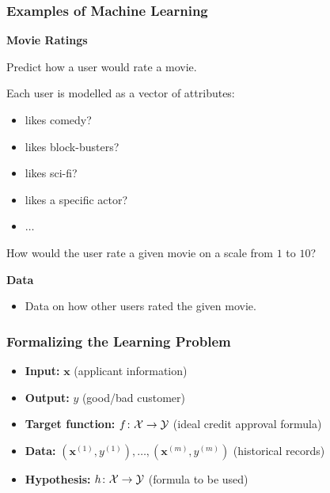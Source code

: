 \documentclass[xcolor=table]{beamer}
\newcommand{\vect}[1]{\ensuremath{\mathbf{#1}}}
\newcommand{\calX}{\ensuremath{{\cal X}}}
\newcommand{\calY}{\ensuremath{{\cal Y}}}
\begin{document}
\begin{frame}[t]
\frametitle{Examples of Machine Learning}
\textcolor{orange2}{\textbf{Movie Ratings}}

Predict how a user would rate a movie.

\pause

\medskip

Each user is modelled as a vector of attributes:
\begin{itemize}
    \item likes comedy?  
    \item likes block-busters?
    \item likes sci-fi?
    \item likes a specific actor?
    \item $\ldots$
\end{itemize}

\pause

How would the user rate a given movie on a scale from $1$ to $10$?

\bigskip

\textbf{Data}
\begin{itemize}
    \item Data on how other users rated the given movie. 
\end{itemize}
\end{frame}


\begin{frame}[t]
\frametitle{Formalizing the Learning Problem}
\begin{itemize}
    \item \textbf{Input:} $\vect{x}$ (applicant information)

    \pause

    \item \textbf{Output:} $y$ (good/bad customer)
    
    \pause

    \item \textbf{Target function:} $f \colon \calX \rightarrow \calY$ (ideal credit
    approval formula)
    
    \pause

    \item \textbf{Data:} $(\vect{x}^{(1)}, y^{(1)}), \ldots, (\vect{x}^{(m)},
    y^{(m)})$ (historical records)
    
    \pause

    \item \textbf{Hypothesis:} $h \colon \calX \rightarrow \calY$ (formula to be used)
\end{itemize} 
\end{frame}
\end{document}
